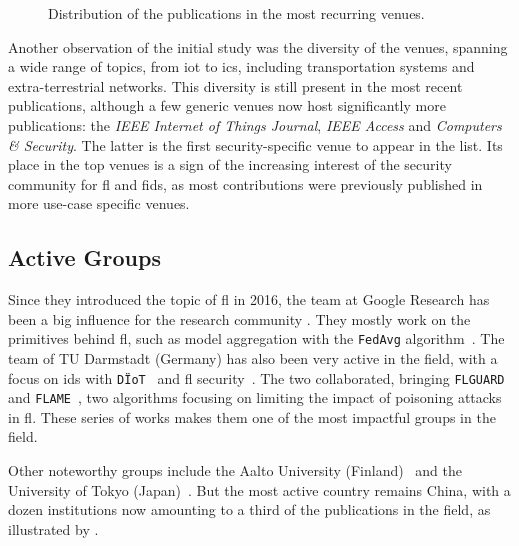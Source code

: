 \begin{figure}
  \centering
  
  \caption{
    Distribution of the publications in the most recurring venues.
    \label{fig:sota.venues}
  }
\end{figure}

Another observation of the initial study was the diversity of the venues, spanning a wide range of topics, from \gls{iot} to \gls{ics}, including transportation systems and extra-terrestrial networks.
This diversity is still present in the most recent publications, although a few generic venues now host significantly more publications: the \emph{IEEE Internet of Things Journal}, \emph{IEEE Access} and \emph{Computers \& Security}.
The latter is the first security-specific venue to appear in the list.
Its place in the top venues is a sign of the increasing interest of the security community for \gls{fl} and \gls{fids}, as most contributions were previously published in more use-case specific venues.


\subsection{Active Groups\label{sec:sota.quanti.authors}}

Since they introduced the topic of \gls{fl} in 2016, the team at Google Research has been a big influence for the research community \cite{konecny_FederatedLearningStrategies_2016,konecny_FederatedOptimizationDistributed_2016,mcmahan_Communicationefficientlearningdeep_2017,bonawitz_PracticalSecureAggregation_2017,bonawitz_FederatedLearningScale_2019}.
They mostly work on the primitives behind \gls{fl}, such as model aggregation with the \texttt{FedAvg} algorithm~\cite{mcmahan_Communicationefficientlearningdeep_2017}.
The team of TU Darmstadt (Germany) has also been very active in the field, with a focus on \gls{ids} with \texttt{DÏoT}~\cite{marchal_AuDIAutonomousIoT_2019,nguyen_DIoTFederatedSelflearning_2019} and \gls{fl} security~\cite{nguyen_PoisoningAttacksFederated_2020b}.
The two collaborated, bringing \texttt{FLGUARD}~\cite{nguyen_FLGUARDSecurePrivate_2021} and \texttt{FLAME}~\cite{nguyen_FLAMETamingBackdoors_2022}, two algorithms focusing on limiting the impact of poisoning attacks in \gls{fl}.
These series of works makes them one of the most impactful groups in the field.

Other noteworthy groups include the Aalto University (Finland)~\cite{nguyen_FLGUARDSecurePrivate_2021} and the University of Tokyo (Japan)~\cite{sun_AdaptiveFederatedLearning_2020,sun_AdaptiveIntrusionDetection_2021,qin_FederatedLearningBasedNetwork_2021}.
But the most active country remains China, with a dozen institutions now amounting to a third of the publications in the field, as illustrated by .


